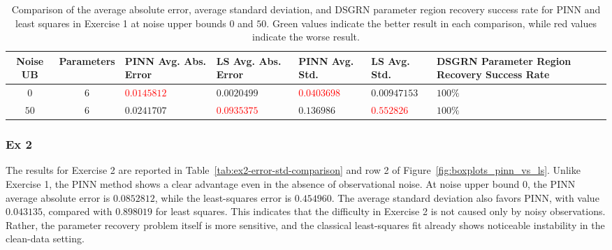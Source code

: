 \documentclass[11pt]{article}
\begin{document}
\begin{table}[H]
\centering
\scriptsize
\renewcommand{\arraystretch}{1.25}
\setlength{\tabcolsep}{3pt}
\begin{tabularx}{\textwidth}{|c|c|
>{\centering\arraybackslash}X|
>{\centering\arraybackslash}X|
>{\centering\arraybackslash}X|
>{\centering\arraybackslash}X|
>{\centering\arraybackslash}X|}
\hline
\textbf{Noise UB} &
\textbf{Parameters} &
\textbf{PINN Avg. Abs. Error} &
\textbf{LS Avg. Abs. Error} &
\textbf{PINN Avg. Std.} &
\textbf{LS Avg. Std.} &
\textbf{DSGRN Parameter Region Recovery Success Rate} \\
\hline

\(0\) & \(6\)
& \textcolor{red}{\(0.0145812\)}
& \textcolor{green!50!black}{\(0.0020499\)}
& \textcolor{red}{\(0.0403698\)}
& \textcolor{green!50!black}{\(0.00947153\)}
& \textcolor{green!50!black}{\(100\%\)} \\
\hline

\(50\) & \(6\)
& \textcolor{green!50!black}{\(0.0241707\)}
& \textcolor{red}{\(0.0935375\)}
& \textcolor{green!50!black}{\(0.136986\)}
& \textcolor{red}{\(0.552826\)}
& \textcolor{green!50!black}{\(100\%\)} \\
\hline

\end{tabularx}
\caption{Comparison of the average absolute error, average standard deviation, and DSGRN parameter region recovery success rate for PINN and least squares in Exercise 1 at noise upper bounds \(0\) and \(50\). Green values indicate the better result in each comparison, while red values indicate the worse result.}
\label{tab:ex1-error-std-comparison}
\end{table}

\subsubsection{Ex 2}

The results for Exercise 2 are reported in Table~\ref{tab:ex2-error-std-comparison} and row 2 of Figure~\ref{fig:boxplots_pinn_vs_ls}. Unlike Exercise 1, the PINN method shows a clear advantage even in the absence of observational noise. At noise upper bound \(0\), the PINN average absolute error is \(0.0852812\), while the least-squares error is \(0.454960\). The average standard deviation also favors PINN, with value \(0.043135\), compared with \(0.898019\) for least squares. This indicates that the difficulty in Exercise 2 is not caused only by noisy observations. Rather, the parameter recovery problem itself is more sensitive, and the classical least-squares fit already shows noticeable instability in the clean-data setting.
\end{document}
